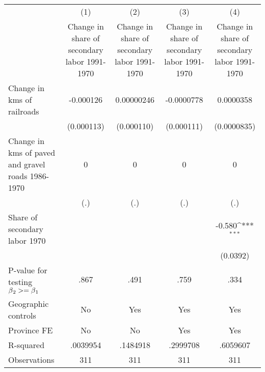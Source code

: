{
\def\sym#1{\ifmmode^{#1}\else\(^{#1}\)\fi}
\begin{tabular}{l*{4}{c}}
\hline\hline
                &\multicolumn{1}{c}{(1)}&\multicolumn{1}{c}{(2)}&\multicolumn{1}{c}{(3)}&\multicolumn{1}{c}{(4)}\\
                &\multicolumn{1}{c}{Change in share of secondary labor 1991-1970}&\multicolumn{1}{c}{Change in share of secondary labor 1991-1970}&\multicolumn{1}{c}{Change in share of secondary labor 1991-1970}&\multicolumn{1}{c}{Change in share of secondary labor 1991-1970}\\
\hline
Change in kms of railroads&-0.000126         &0.00000246         &-0.0000778         &0.0000358         \\
                &(0.000113)         &(0.000110)         &(0.000111)         &(0.0000835)         \\
[1em]
Change in kms of paved and gravel roads 1986-1970&        0         &        0         &        0         &        0         \\
                &      (.)         &      (.)         &      (.)         &      (.)         \\
[1em]
Share of secondary labor 1970&                  &                  &                  &   -0.580\sym{***}\\
                &                  &                  &                  & (0.0392)         \\
\hline
P-value for testing $\beta\\_2 >= \beta\\_1$&     .867         &     .491         &     .759         &     .334         \\
Geographic controls&       No         &      Yes         &      Yes         &      Yes         \\
Province FE     &       No         &       No         &      Yes         &      Yes         \\
R-squared       & .0039954         & .1484918         & .2999708         & .6059607         \\
Observations    &      311         &      311         &      311         &      311         \\
\hline\hline
\end{tabular}
}
